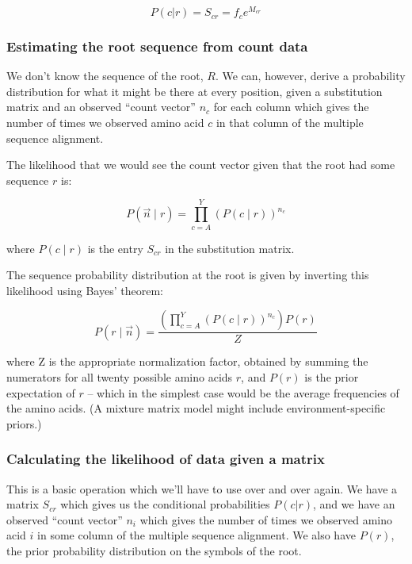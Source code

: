 \begin{equation}
 P(c | r) = S_{cr} = f_{c} e^{M_{cr}}
\end{equation}

\subsubsection {Estimating the root sequence from count data}

We don't know the sequence of the root, $R$. We can, however, derive a
probability distribution for what it might be there at every position,
given a substitution matrix and an observed ``count vector'' $n_{c}$
for each column which gives the number of times we observed amino acid
$c$ in that column of the multiple sequence alignment.

The likelihood that we would see the count vector given that the root
had some sequence $r$ is:

\begin{equation}
P(\vec{n} \mid r) = \prod_{c = A}^{Y} (P(c \mid r))^{n_{c}} 
\end{equation}

where $P(c \mid r)$ is the entry $S_{cr}$ in the substitution matrix.

The sequence probability distribution at the root is given
by inverting this likelihood using Bayes' theorem:

\begin{equation}
P(r \mid \vec{n}) = \frac{ (\prod_{c = A}^{Y} (P(c \mid r))^{n_{c}} ) P(r) }
                         { Z }
\end{equation}

where Z is the appropriate normalization factor, obtained by summing
the numerators for all twenty possible amino acids $r$, and $P(r)$ is
the prior expectation of $r$ -- which in the simplest case would be
the average frequencies of the amino acids. (A mixture matrix model
might include environment-specific priors.)

\subsubsection { Calculating the likelihood of data given a matrix }

This is a basic operation which we'll have to use over and over again.
We have a matrix $S_{cr}$ which gives us the conditional probabilities
$P(c|r)$, and we have an observed ``count vector'' $n_{i}$ which gives
the number of times we observed amino acid $i$ in some column of the
multiple sequence alignment. We also have $P(r)$, the prior
probability distribution on the symbols of the root.

